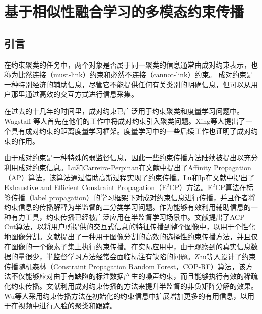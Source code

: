 \chapter{基于相似性融合学习的多模态约束传播}
\section{引言}
在约束聚类的任务中，两个对象是否属于同一聚类的信息通常由成对约束表示，也称为比然连接（must-link）约束和必然不连接（cannot-link）约束。 成对约束是一种特别经济的辅助信息，尽管它不能提供任何有关类别的明确信息，但可以从用户那里通过高效的交互方式进行信息采集。

在过去的十几年的时间里，成对约束已广泛用于约束聚类和度量学习问题中。Wagstaff 等人首先在他们的工作中将成对约束引入聚类问题\cite{wagstaff2000clustering,wagstaff2001constrained}。Xing等人提出了一个具有成对约束的距离度量学习框架\cite{xing2002distance}。度量学习中的一些后续工作也证明了成对约束的作用\cite{weinberger2005distance,davis2007information}。

由于成对约束是一种特殊的弱监督信息，因此一些约束传播方法\cite{lu2008constrained,lu2010constrained,fu2011symmetric}陆续被提出以充分利用成对约束信息。Lu和Carreira-Perpinan在文献\parencite{lu2008constrained}中提出了Affinity Propagation（AP）算法，该算法通过借助高斯过程实现了约束传播。Lu和Ip在文献\parencite{lu2010constrained}中提出了Exhaustive and Efficient Constraint Propagation（E$^2$CP）方法。E$^2$CP算法在标签传播（label propagation）\cite{zhou2004learning}的学习框架下对成对约束信息进行传播，并且作者将约束信息的传播解释为半监督的二分类学习问题。作为能够有效利用辅助信息的一种有力工具，约束传播已经被广泛应用在半监督学习场景中。文献\parencite{jian2016interactive}提出了ACP Cut算法，以将用户所提供的交互式信息的特征传播到整个图像中，以用于个性化地图像分割。文献\parencite{han2016segmentation}提出了一种用于图像分割的高效的选择性约束传播方法，并且仅在图像的一个像素子集上执行约束传播。在实际应用中，由于观察到的真实信息数据的量很少，半监督学习方法经常会面临标注有缺陷的问题。Zhu等人设计了约束传播随机森林（Constraint Propagation Random Forest，COP-RF）算法\cite {zhu2016constrained}，该方法不仅能够应对由于有缺陷的标注数据产生的噪声约束，而且能够执行有效的稀疏化约束传播。文献\parencite{wang2016semi}利用成对约束传播的方法来提升半监督的非负矩阵分解的效果。Wu等人采用约束传播方法在初始化的约束信息中扩展增加更多的有用信息，以用于在视频中进行人脸的聚类和跟踪\cite{wu2017coupled}。

